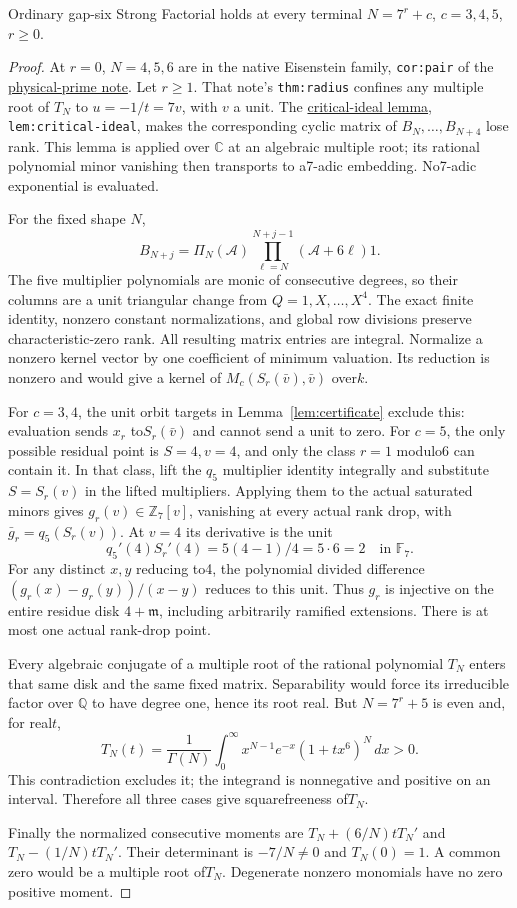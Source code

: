 \documentclass[11pt]{article}
\begin{document}
\begin{theorem}\label{thm:families}
Ordinary gap-six Strong Factorial holds at every terminal
$N=7^r+c$, $c=3,4,5$, $r\ge0$.
\end{theorem}
\begin{proof}
At $r=0$, $N=4,5,6$ are in the native Eisenstein family,
\texttt{cor:pair} of the
\href{PHYSICAL_PRIME_TOTAL_DEGREE_REDUCTION.tex}{physical-prime note}.
Let $r\ge1$.
That note's \texttt{thm:radius} confines any multiple root of $T_N$
to $u=-1/t=7v$, with $v$ a unit.
The \href{gap_three_hurwitz_structure.tex}{critical-ideal lemma},
\texttt{lem:critical-ideal}, makes the corresponding cyclic matrix
of $B_N,\ldots,B_{N+4}$ lose rank.
This lemma is applied over $\mathbb C$ at an algebraic multiple root;
its rational polynomial minor vanishing then transports to a7-adic
embedding. No7-adic exponential is evaluated.

For the fixed shape $N$,
\[
 B_{N+j}=\Pi_N(\mathcal A)
       \prod_{\ell=N}^{N+j-1}(\mathcal A+6\ell)1.
\]
The five multiplier polynomials are monic of consecutive degrees,
so their columns are a unit triangular change from $Q=1,X,\ldots,X^4$.
The exact finite identity, nonzero constant normalizations, and global
row divisions preserve characteristic-zero rank.
All resulting matrix entries are integral.
Normalize a nonzero kernel vector by one coefficient of minimum
valuation. Its reduction is nonzero and would give a kernel of
$M_c(S_r(\bar v),\bar v)$ over$k$.

For $c=3,4$, the unit orbit targets in Lemma~\ref{lem:certificate}
exclude this: evaluation sends $x_r$ to$S_r(\bar v)$ and cannot
send a unit to zero.
For $c=5$, the only possible residual point is $S=4,v=4$, and
only the class $r=1$ modulo6 can contain it.
In that class, lift the $q_5$ multiplier identity integrally and
substitute $S=S_r(v)$ in the lifted multipliers.
Applying them to the actual saturated minors gives
$g_r(v)\in\mathbb Z_7[v]$, vanishing at every actual rank drop,
with $\bar g_r=q_5(S_r(v))$.
At $v=4$ its derivative is the unit
\[
 q_5'(4)S_r'(4)=5(4-1)/4=5\cdot6=2\quad\text{in }\mathbb F_7.
\]
For any distinct $x,y$ reducing to4, the polynomial divided
difference $(g_r(x)-g_r(y))/(x-y)$ reduces to this unit.
Thus $g_r$ is injective on the entire residue disk
$4+\mathfrak m$, including arbitrarily ramified extensions.
There is at most one actual rank-drop point.

Every algebraic conjugate of a multiple root of the rational
polynomial $T_N$ enters that same disk and the same fixed matrix.
Separability would force its irreducible factor over $\mathbb Q$
to have degree one, hence its root real.
But $N=7^r+5$ is even and, for real$t$,
\[
 T_N(t)=\frac1{\Gamma(N)}
       \int_0^\infty x^{N-1}e^{-x}(1+tx^6)^N\,dx>0.
\]
This contradiction excludes it; the integrand is nonnegative and
positive on an interval.
Therefore all three cases give squarefreeness of$T_N$.

Finally the normalized consecutive moments are
$T_N+(6/N)tT_N'$ and $T_N-(1/N)tT_N'$.
Their determinant is $-7/N\ne0$ and $T_N(0)=1$.
A common zero would be a multiple root of$T_N$.
Degenerate nonzero monomials have no zero positive moment.
\end{proof}
\end{document}
